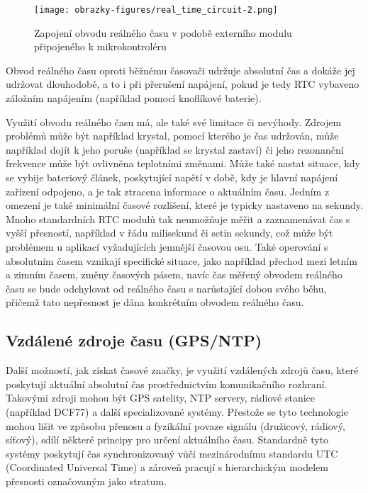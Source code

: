 \newpage

\begin{figure}[h]
    \centering
    \texttt{[image: obrazky-figures/real\_time\_circuit-2.png]}
    
    \caption{Zapojení obvodu reálného času v podobě externího modulu připojeného k mikrokontroléru \cite{embed_journal_interfacing_rtc_with_microcontroler}}
    \label{fig:real-time-circuit}
\end{figure}

Obvod reálného času oproti běžnému časovači udržuje absolutní čas a dokáže jej udržovat dlouhodobě, a to i při přerušení napájení, pokud je tedy RTC vybaveno záložním napájením (například pomocí knoflíkové baterie).

Využití obvodu reálného času má, ale také své limitace či nevýhody. Zdrojem problémů může být například krystal, pomocí kterého je čas udržován, může například dojít k jeho poruše (například se krystal zastaví) či jeho rezonanční frekvence může být ovlivněna teplotními změnami. Může také nastat situace, kdy se vybije bateriový článek, poskytující napětí v době, kdy je hlavní napájení zařízení odpojeno, a je tak ztracena informace o aktuálním času. Jedním z omezení je také minimální časové rozlišení, které je typicky nastaveno na sekundy. Mnoho standardních RTC modulů tak neumožňuje měřit a zaznamenávat čas s vyšší přesností, například v řádu milisekund či setin sekundy, což může být problémem u aplikací vyžadujících jemnější časovou osu. Také operování s absolutním časem vznikají specifické situace, jako například přechod mezi letním a zimním časem, změny časových pásem, navíc čas měřený obvodem reálného času se bude odchylovat od reálného času s narůstající dobou svého běhu, přičemž tato nepřesnost je dána konkrétním obvodem reálného času. \cite{jameco_choosing_right_real_time_clock_chip_or_module, embed_journal_interfacing_rtc_with_microcontroler, medium_rtc}

\subsection{Vzdálené zdroje času (GPS/NTP)}
Další možností, jak získat časové značky, je využití vzdálených zdrojů času, které poskytují aktuální absolutní čas prostřednictvím komunikačního rozhraní. Takovými zdroji mohou být GPS satelity, NTP servery, rádiové stanice (například DCF77) a další specializované systémy. Přestože se tyto technologie mohou lišit ve způsobu přenosu a fyzikální povaze signálu (družicový, rádiový, síťový), sdílí některé principy pro určení aktuálního času. Standardně tyto systémy poskytují čas synchronizovaný vůči mezinárodnímu standardu UTC (Coordinated Universal Time) a zároveň pracují s hierarchickým modelem přesnosti označovaným jako stratum.

